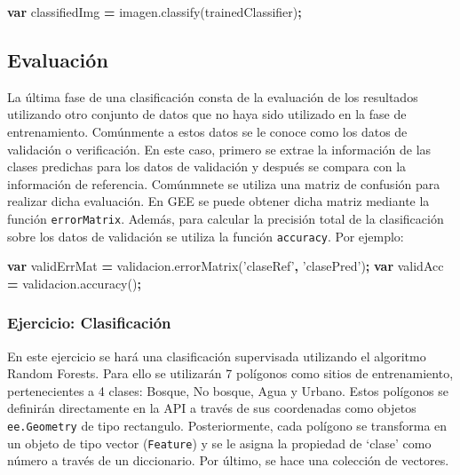 \documentclass[
]{article}
\newenvironment{Shaded}{\begin{snugshade}}{\end{snugshade}}
\newcommand{\AttributeTok}[1]{\textcolor[rgb]{0.77,0.63,0.00}{#1}}
\newcommand{\KeywordTok}[1]{\textcolor[rgb]{0.13,0.29,0.53}{\textbf{#1}}}
\newcommand{\NormalTok}[1]{#1}
\newcommand{\OperatorTok}[1]{\textcolor[rgb]{0.81,0.36,0.00}{\textbf{#1}}}
\newcommand{\StringTok}[1]{\textcolor[rgb]{0.31,0.60,0.02}{#1}}
\newcommand{\VariableTok}[1]{\textcolor[rgb]{0.00,0.00,0.00}{#1}}
\begin{document}
\begin{Shaded}
\begin{Highlighting}[]
\KeywordTok{var}\NormalTok{ classifiedImg }\OperatorTok{=} \VariableTok{imagen}\NormalTok{.}\AttributeTok{classify}\NormalTok{(trainedClassifier)}\OperatorTok{;}
\end{Highlighting}
\end{Shaded}

\hypertarget{evaluaciuxf3n}{%
\subsection{Evaluación}\label{evaluaciuxf3n}}

La última fase de una clasificación consta de la evaluación de los
resultados utilizando otro conjunto de datos que no haya sido utilizado
en la fase de entrenamiento. Comúnmente a estos datos se le conoce como
los datos de validación o verificación. En este caso, primero se extrae
la información de las clases predichas para los datos de validación y
después se compara con la información de referencia. Comúnmnete se
utiliza una matriz de confusión para realizar dicha evaluación. En GEE
se puede obtener dicha matriz mediante la función \texttt{errorMatrix}.
Además, para calcular la precisión total de la clasificación sobre los
datos de validación se utiliza la función \texttt{accuracy}. Por
ejemplo:

\begin{Shaded}
\begin{Highlighting}[]
\KeywordTok{var}\NormalTok{ validErrMat }\OperatorTok{=} \VariableTok{validacion}\NormalTok{.}\AttributeTok{errorMatrix}\NormalTok{(}\StringTok{'claseRef'}\OperatorTok{,} \StringTok{'clasePred'}\NormalTok{)}\OperatorTok{;}
\KeywordTok{var}\NormalTok{ validAcc }\OperatorTok{=} \VariableTok{validacion}\NormalTok{.}\AttributeTok{accuracy}\NormalTok{()}\OperatorTok{;}
\end{Highlighting}
\end{Shaded}

\hypertarget{ejercicio-clasificaciuxf3n}{%
\subsubsection{Ejercicio:
Clasificación}\label{ejercicio-clasificaciuxf3n}}

En este ejercicio se hará una clasificación supervisada utilizando el
algoritmo Random Forests. Para ello se utilizarán 7 polígonos como
sitios de entrenamiento, pertenecientes a 4 clases: Bosque, No bosque,
Agua y Urbano. Estos polígonos se definirán directamente en la API a
través de sus coordenadas como objetos \texttt{ee.Geometry} de tipo
rectangulo. Posteriormente, cada polígono se transforma en un objeto de
tipo vector (\texttt{Feature}) y se le asigna la propiedad de `clase'
como número a través de un diccionario. Por último, se hace una
colección de vectores.
\end{document}
